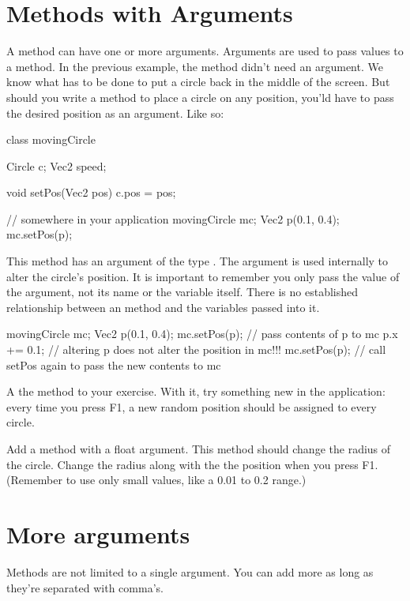 \section{Methods with Arguments}
A method can have one or more arguments. Arguments are used to pass values to a method. In the previous example, the  method didn't need an argument. We know what has to be done to put a circle back in the middle of the screen. But should you write a method to place a circle on any position, you'ld have to pass the desired position as an argument. Like so:

\begin{code}
class movingCircle {
  Circle c;
  Vec2 speed;
  
  void setPos(Vec2 pos) {
    c.pos = pos;
  }
}

// somewhere in your application
movingCircle mc;
Vec2 p(0.1, 0.4);
mc.setPos(p);
\end{code}

This method has an argument of the type . The argument is used internally to alter the circle's position. It is important to remember you only pass the value of the argument, not its name or the variable itself. There is no established relationship between an method and the variables passed into it. 

\begin{code}
movingCircle mc;
Vec2 p(0.1, 0.4);
mc.setPos(p);     // pass contents of p to mc
p.x += 0.1;       // altering p does not alter the position in mc!!!
mc.setPos(p);     // call setPos again to pass the new contents to mc
\end{code}

\begin{exercise}
A the method  to your exercise. With it, try something new in the application: every time you press F1, a new random position should be assigned to every circle.

Add a method  with a float argument. This method should change the radius of the circle. Change the radius along with the the position when you press F1. (Remember to use only small values, like a 0.01 to 0.2 range.)
\end{exercise}

\section{More arguments}
Methods are not limited to a single argument. You can add more as long as they're separated with comma's.

